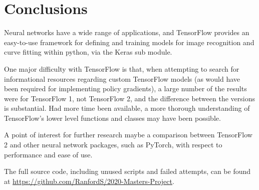 \chapter{Conclusions}

Neural networks have a wide range of applications, and TensorFlow provides an
easy-to-use framework for defining and training models for image recognition and
curve fitting within python, via the Keras sub module.

One major difficulty with TensorFlow is that, when attempting to search for
informational resources regarding custom TensorFlow models (as would have been
required for implementing policy gradients), a large number of the results were
for TensorFlow 1, not TensorFlow 2, and the difference between the versions is
substantial.
Had more time been available, a more thorough understanding of TensorFlow's
lower level functions and classes may have been possible.

A point of interest for further research maybe a comparison between TensorFlow 2
and other neural network packages, such as PyTorch, with respect to performance
and ease of use.

The full source code, including unused scripts and failed attempts,
can be found at \url{https://github.com/RanfordS/2020-Masters-Project}.

